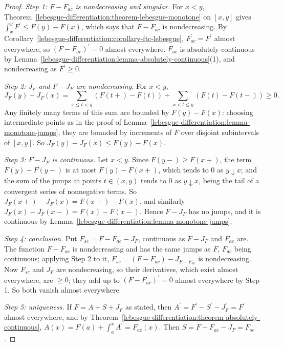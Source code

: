 \begin{proof}
\emph{Step 1: $F - F_{ac}$ is nondecreasing and singular.} For $x < y$, Theorem~\ref{lebesgue-differentiation:theorem-lebesgue-monotone} on $[x, y]$ gives $\int_x^yF^{\prime} \leq F(y) - F(x)$, which says that
$F - F_{ac}$ is nondecreasing. By Corollary~\ref{lebesgue-differentiation:corollary-ftc-lebesgue}, $F_{ac}^{\prime} = F^{\prime}$ almost everywhere, so $(F - F_{ac})^{\prime} = 0$ almost everywhere. $F_{ac}$ is absolutely
continuous by Lemma~\ref{lebesgue-differentiation:lemma-absolutely-continuous}(1), and nondecreasing as $F^{\prime} \geq 0$.

\emph{Step 2: $J_F$ and $F - J_F$ are nondecreasing.} For $x < y$,
\[
J_F(y) - J_F(x) = \sum_{x \leq t < y}(F(t+) - F(t)) + \sum_{x < t \leq y}(F(t) - F(t-)) \geq 0 .
\]
Any finitely many terms of this sum are bounded by $F(y) - F(x)$: choosing intermediate points as in the proof of Lemma~\ref{lebesgue-differentiation:lemma-monotone-jumps}, they are bounded by increments of $F$
over disjoint subintervals of $[x, y]$. So $J_F(y) - J_F(x) \leq F(y) - F(x)$.

\emph{Step 3: $F - J_F$ is continuous.} Let $x < y$. Since $F(y-) \geq F(x+)$, the term $F(y) - F(y-)$ is at most $F(y) - F(x+)$, which tends to $0$ as $y \downarrow x$; and the sum of the jumps at points
$t \in (x, y)$ tends to $0$ as $y \downarrow x$, being the tail of a convergent series of nonnegative terms. So $J_F(x+) - J_F(x) = F(x+) - F(x)$, and similarly $J_F(x) - J_F(x-) = F(x) - F(x-)$. Hence
$F - J_F$ has no jumps, and it is continuous by Lemma~\ref{lebesgue-differentiation:lemma-monotone-jumps}.

\emph{Step 4: conclusion.} Put $F_{sc} = F - F_{ac} - J_F$, continuous as $F - J_F$ and $F_{ac}$ are. The function $F - F_{ac}$ is nondecreasing and has the same jumps as $F$, $F_{ac}$ being continuous;
applying Step 2 to it, $F_{sc} = (F - F_{ac}) - J_{F - F_{ac}}$ is nondecreasing. Now $F_{sc}$ and $J_F$ are nondecreasing, so their derivatives, which exist almost everywhere, are $\geq 0$; they add up to
$(F - F_{ac})^{\prime} = 0$ almost everywhere by Step 1. So both vanish almost everywhere.

\emph{Step 5: uniqueness.} If $F = A + S + J_F$ as stated, then $A^{\prime} = F^{\prime} - S^{\prime} - J_F^{\prime} = F^{\prime}$ almost everywhere, and by
Theorem~\ref{lebesgue-differentiation:theorem-absolutely-continuous}, $A(x) = F(a) + \int_a^xA^{\prime} = F_{ac}(x)$. Then $S = F - F_{ac} - J_F = F_{sc}$.
\end{proof}

